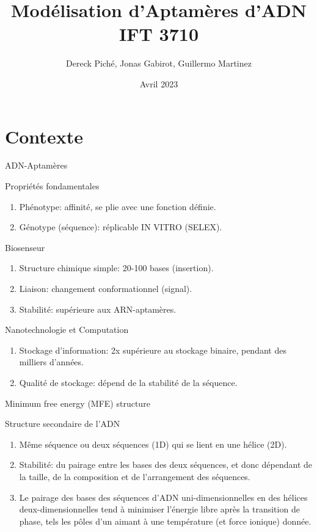 \documentclass{beamer}
\title{Modélisation d'Aptamères d'ADN IFT 3710}
\author{Dereck Piché, Jonas Gabirot, Guillermo Martinez}
\institute{Université de Montréal}
\date{Avril 2023}
\begin{document}
\frame{\titlepage}

\section{Contexte}
\begin{frame}{ADN-Aptamères}
\begin{block}{Propriétés fondamentales}
\begin{enumerate}
    \item Phénotype: affinité, se plie avec une fonction définie.
    \item Génotype (séquence): réplicable IN VITRO (SELEX).
\end{enumerate}
\end{block}

\begin{block}{Biosenseur}
\begin{enumerate}
    \item Structure chimique simple: 20-100 bases (insertion).
    \item Liaison: changement conformationnel (signal).
    \item Stabilité: supérieure aux ARN-aptamères.
\end{enumerate}
\end{block}

\begin{block}{Nanotechnologie et Computation}
\begin{enumerate}
    \item Stockage d'information: 2x supérieure au stockage binaire, pendant des milliers d'années.
    \item Qualité de stockage: dépend de la stabilité de la séquence.
\end{enumerate}
\end{block}

\end{frame}

\begin{frame}{Minimum free energy (MFE) structure}

\begin{block}{Structure secondaire de l'ADN}
\begin{enumerate}
    \item Même séquence ou deux séquences (1D) qui se lient en une hélice (2D).
    \item Stabilité: du pairage entre les bases des deux séquences, et donc dépendant de la taille, de la composition et de l'arrangement des séquences.
    \item Le pairage des bases des séquences d'ADN uni-dimensionnelles en des hélices deux-dimensionnelles tend à minimiser l'énergie libre après la transition de phase, tels les pôles d'un aimant à une température (et force ionique) donnée.
\end{enumerate}
\end{block}

\end{frame}
\end{document}
